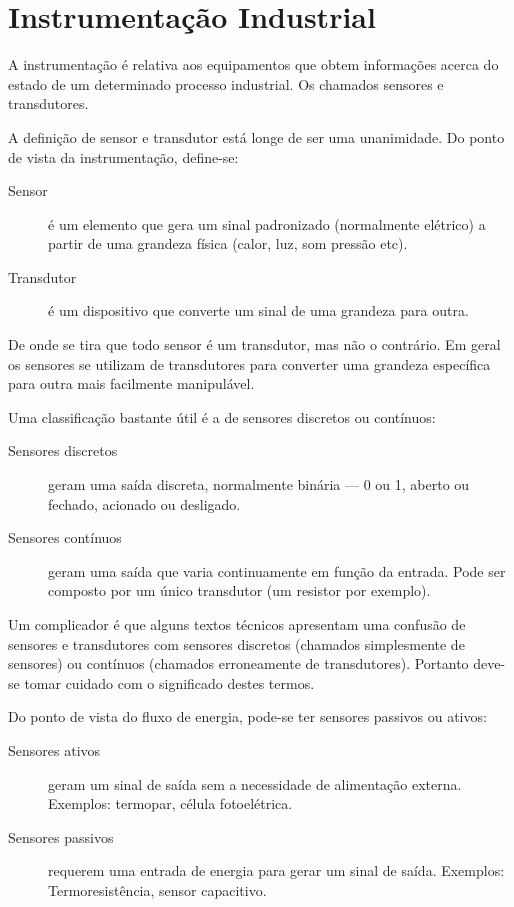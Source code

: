   \chapter{Instrumentação Industrial}

A instrumentação é relativa aos equipamentos que obtem informações acerca do estado de um determinado processo industrial. Os chamados sensores e transdutores.

A definição de sensor e transdutor está longe de ser uma unanimidade. Do ponto de vista da instrumentação, define-se:
\begin{description}
  \item[Sensor] é um elemento que gera um sinal padronizado (normalmente elétrico) a partir de uma grandeza física (calor, luz, som pressão etc).
  \item[Transdutor] é um dispositivo que converte um sinal de uma grandeza para outra.
\end{description}

De onde se tira que todo sensor é um transdutor, mas não o contrário. Em geral os sensores se utilizam de transdutores para converter uma grandeza específica para outra mais facilmente manipulável.

Uma classificação bastante útil é a de sensores discretos ou contínuos:

\begin{description}
  \item[Sensores discretos] geram uma saída discreta, normalmente binária --- 0 ou 1, aberto ou fechado, acionado ou desligado.
  \item[Sensores contínuos] geram uma saída que varia continuamente em função da entrada. Pode ser composto por um único transdutor (um resistor por exemplo).
\end{description}

Um complicador é que alguns textos técnicos apresentam uma confusão de sensores e transdutores com sensores discretos (chamados simplesmente de sensores) ou contínuos (chamados erroneamente de transdutores). Portanto deve-se tomar cuidado com o significado destes termos.

Do ponto de vista do fluxo de energia, pode-se ter sensores passivos ou ativos:
\begin{description}
  \item[Sensores ativos] geram um sinal de saída sem a necessidade de alimentação externa. Exemplos: termopar, célula fotoelétrica.
  \item[Sensores passivos] requerem uma entrada de energia para gerar um sinal de saída. Exemplos: Termoresistência, sensor capacitivo.
\end{description}

